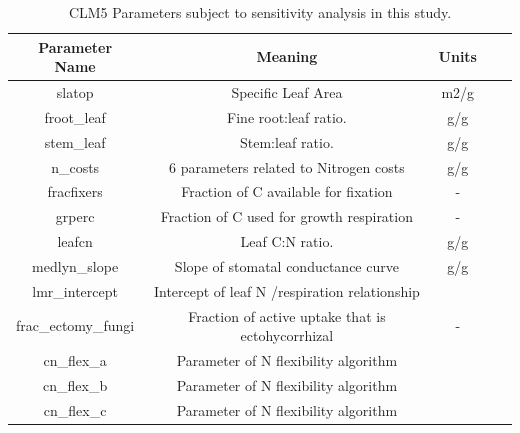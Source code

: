 \documentclass[draft,linenumbers]{agujournal}
\begin{document}
\nocite{*}

\clearpage


\pagebreak
\begin{table}
\begin{center}
\begin{tabular}{ |c|c|c|c|c| } 
 \hline
 Parameter Name & Meaning & Units \\
  \hline
 slatop & Specific Leaf Area & m2/g \\ 
 froot\_leaf & Fine root:leaf ratio. & g/g \\
 stem\_leaf  & Stem:leaf ratio. & g/g \\ 
 n\_costs    & 6 parameters related to Nitrogen costs & g/g \\
 fracfixers  & Fraction of C available for fixation & - \\
  grperc  & Fraction of C used for growth respiration  & - \\
  leafcn  & Leaf C:N ratio. & g/g \\
     medlyn\_slope  & Slope of stomatal conductance curve & g/g \\
      lmr\_intercept & Intercept of leaf N /respiration relationship & \\
      frac\_ectomy\_fungi} & Fraction of active uptake that is ectohycorrhizal & - \\
      cn\_flex\_a & Parameter of N flexibility algorithm& \\
      cn\_flex\_b & Parameter of N flexibility algorithm & \\
      cn\_flex\_c & Parameter of N flexibility algorithm & \\
\hline
\end{tabular}
\end{center}
\caption{CLM5 Parameters subject to sensitivity analysis in this study. }
\label{table_parameters}
\end{table}
\end{document}
